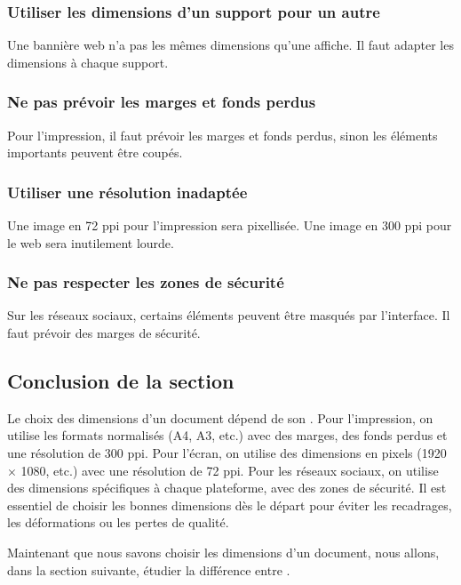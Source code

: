 \subsubsection{Utiliser les dimensions d'un support pour un autre}

Une bannière web n'a pas les mêmes dimensions qu'une affiche. Il faut adapter les dimensions à chaque support.

\subsubsection{Ne pas prévoir les marges et fonds perdus}

Pour l'impression, il faut prévoir les marges et fonds perdus, sinon les éléments importants peuvent être coupés.

\subsubsection{Utiliser une résolution inadaptée}

Une image en 72 ppi pour l'impression sera pixellisée. Une image en 300 ppi pour le web sera inutilement lourde.

\subsubsection{Ne pas respecter les zones de sécurité}

Sur les réseaux sociaux, certains éléments peuvent être masqués par l'interface. Il faut prévoir des marges de sécurité.

\subsection*{Conclusion de la section}

Le choix des dimensions d'un document dépend de son . Pour l'impression, on utilise les formats normalisés (A4, A3, etc.) avec des marges, des fonds perdus et une résolution de 300 ppi. Pour l'écran, on utilise des dimensions en pixels (1920 × 1080, etc.) avec une résolution de 72 ppi. Pour les réseaux sociaux, on utilise des dimensions spécifiques à chaque plateforme, avec des zones de sécurité. Il est essentiel de choisir les bonnes dimensions dès le départ pour éviter les recadrages, les déformations ou les pertes de qualité.

Maintenant que nous savons choisir les dimensions d'un document, nous allons, dans la section suivante, étudier la différence entre .

